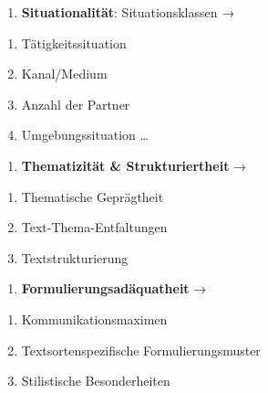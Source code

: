 \documentclass[
  letterpaper,
]{scrbook}
\providecommand{\tightlist}{%
  \setlength{\itemsep}{0pt}\setlength{\parskip}{0pt}}\usepackage{longtable,booktabs,array}
\begin{document}
\begin{enumerate}
\def\labelenumi{\arabic{enumi}.}
\setcounter{enumi}{1}
\tightlist
\item
  \textbf{Situationalität}: Situationsklassen →\\
\end{enumerate}

\begin{enumerate}
\def\labelenumi{\alph{enumi})}
\tightlist
\item
  Tätigkeitssituation\\
\item
  Kanal/Medium\\
\item
  Anzahl der Partner\\
\item
  Umgebungssituation \ldots{}\\
\end{enumerate}

\begin{enumerate}
\def\labelenumi{\arabic{enumi}.}
\setcounter{enumi}{2}
\tightlist
\item
  \textbf{Thematizität \& Strukturiertheit} →\\
\end{enumerate}

\begin{enumerate}
\def\labelenumi{\alph{enumi})}
\tightlist
\item
  Thematische Geprägtheit\\
\item
  Text-Thema-Entfaltungen\\
\item
  Textstrukturierung ~
\end{enumerate}

\begin{enumerate}
\def\labelenumi{\arabic{enumi}.}
\setcounter{enumi}{3}
\tightlist
\item
  \textbf{Formulierungsadäquatheit} →\\
\end{enumerate}

\begin{enumerate}
\def\labelenumi{\alph{enumi})}
\tightlist
\item
  Kommunikationsmaximen\\
\item
  Textsortenspezifische Formulierungsmuster\\
\item
  Stilistische Besonderheiten\\
\end{enumerate}
\end{document}
